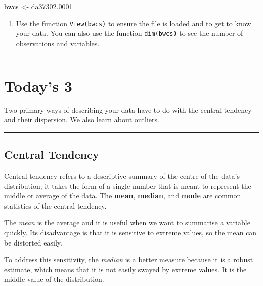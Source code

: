 \documentclass[
]{book}
\newenvironment{Shaded}{\begin{snugshade}}{\end{snugshade}}
\newcommand{\FloatTok}[1]{\textcolor[rgb]{0.00,0.00,0.81}{#1}}
\newcommand{\NormalTok}[1]{#1}
\newcommand{\OtherTok}[1]{\textcolor[rgb]{0.56,0.35,0.01}{#1}}
\providecommand{\tightlist}{%
  \setlength{\itemsep}{0pt}\setlength{\parskip}{0pt}}
\begin{document}
\begin{Shaded}
\begin{Highlighting}[]
\NormalTok{bwcs }\OtherTok{\textless{}{-}}\NormalTok{ da37302}\FloatTok{.0001}
\end{Highlighting}
\end{Shaded}

\begin{enumerate}
\def\labelenumi{\arabic{enumi}.}
\setcounter{enumi}{6}
\tightlist
\item
  Use the function \texttt{View(bwcs)} to ensure the file is loaded and to get to know your data. You can also use the function \texttt{dim(bwcs)} to see the number of observations and variables.
\end{enumerate}

\begin{center}\rule{0.5\linewidth}{0.5pt}\end{center}

\hypertarget{todays-3-1}{%
\section{Today's 3}\label{todays-3-1}}

Two primary ways of describing your data have to do with the central tendency and their dispersion. We also learn about outliers.

\begin{center}\rule{0.5\linewidth}{0.5pt}\end{center}

\hypertarget{central-tendency}{%
\subsection{Central Tendency}\label{central-tendency}}

Central tendency refers to a descriptive summary of the centre of the data's distribution; it takes the form of a single number that is meant to represent the middle or average of the data. The \textbf{mean}, \textbf{median}, and \textbf{mode} are common statistics of the central tendency.

The \emph{mean} is the average and it is useful when we want to summarise a variable quickly. Its disadvantage is that it is sensitive to extreme values, so the mean can be distorted easily.

To address this sensitivity, the \emph{median} is a better measure because it is a robust estimate, which means that it is not easily swayed by extreme values. It is the middle value of the distribution.
\end{document}

